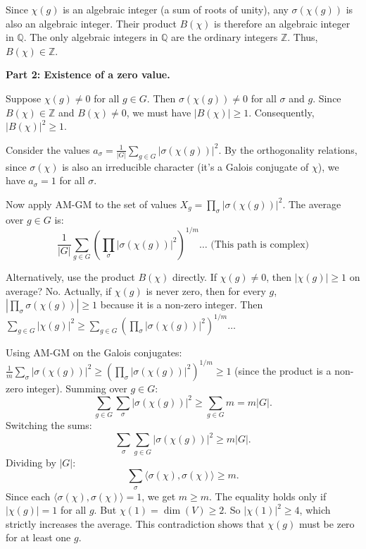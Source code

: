 \begin{solution}
\bigskip

Since $\chi(g)$ is an algebraic integer (a sum of roots of unity), any $\sigma(\chi(g))$ is also an algebraic integer. Their product $B(\chi)$ is therefore an algebraic integer in $\mathbb{Q}$. The only algebraic integers in $\mathbb{Q}$ are the ordinary integers $\mathbb{Z}$. Thus, $B(\chi) \in \mathbb{Z}$.

\bigskip

\textbf{Part 2: Existence of a zero value.}

Suppose $\chi(g) \neq 0$ for all $g \in G$. Then $\sigma(\chi(g)) \neq 0$ for all $\sigma$ and $g$. Since $B(\chi) \in \mathbb{Z}$ and $B(\chi) \neq 0$, we must have $|B(\chi)| \geq 1$. Consequently, $|B(\chi)|^2 \geq 1$.

\bigskip

Consider the values $a_{\sigma} = \frac{1}{|G|} \sum_{g \in G} |\sigma(\chi(g))|^2$. By the orthogonality relations, since $\sigma(\chi)$ is also an irreducible character (it's a Galois conjugate of $\chi$), we have $a_{\sigma} = 1$ for all $\sigma$.

\bigskip

Now apply AM-GM to the set of values $X_g = \prod_{\sigma} |\sigma(\chi(g))|^2$.
The average over $g \in G$ is:
\[ \frac{1}{|G|} \sum_{g \in G} \left( \prod_{\sigma} |\sigma(\chi(g))|^2 \right)^{1/m} \dots \text{ (This path is complex)} \]

\bigskip

Alternatively, use the product $B(\chi)$ directly. If $\chi(g) \neq 0$, then $|\chi(g)| \geq 1$ on average? No.
Actually, if $\chi(g)$ is never zero, then for every $g$, $|\prod_\sigma \sigma(\chi(g))| \geq 1$ because it is a non-zero integer.
Then $\sum_{g \in G} |\chi(g)|^2 \geq \sum_{g \in G} (\prod_\sigma |\sigma(\chi(g))|^2)^{1/m} \dots$

\bigskip

Using AM-GM on the Galois conjugates: $\frac{1}{m} \sum_{\sigma} |\sigma(\chi(g))|^2 \geq (\prod_{\sigma} |\sigma(\chi(g))|^2)^{1/m} \geq 1$ (since the product is a non-zero integer).
Summing over $g \in G$:
\[ \sum_{g \in G} \sum_{\sigma} |\sigma(\chi(g))|^2 \geq \sum_{g \in G} m = m|G|. \]
Switching the sums:
\[ \sum_{\sigma} \sum_{g \in G} |\sigma(\chi(g))|^2 \geq m|G|. \]
Dividing by $|G|$:
\[ \sum_{\sigma} \langle \sigma(\chi), \sigma(\chi) \rangle \geq m. \]
Since each $\langle \sigma(\chi), \sigma(\chi) \rangle = 1$, we get $m \geq m$. The equality holds only if $|\chi(g)| = 1$ for all $g$.
But $\chi(1) = \dim(V) \geq 2$. So $|\chi(1)|^2 \geq 4$, which strictly increases the average. This contradiction shows that $\chi(g)$ must be zero for at least one $g$.
\end{solution}


